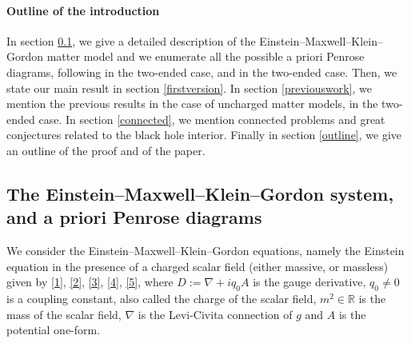 \documentclass[10pt,a4paper]{article}
\theoremstyle{plain}
\theoremstyle{remark}
\theoremstyle{definition}
\newcommand{\RR}{\mathbb{R}}
\theoremstyle{plain}
\theoremstyle{remark}
\theoremstyle{definition}
\numberwithin{equation}{section}
\begin{document}
 	\paragraph{Outline of the introduction} In section \ref{apriori}, we give a detailed description of the Einstein--Maxwell--Klein--Gordon matter model and we enumerate all the possible a priori Penrose diagrams, following \cite{Kommemi} in the two-ended case, and \cite{MihalisSStrapped} in the two-ended case. Then, we state our main result in section \ref{firstversion}. In section \ref{previouswork}, we mention the previous results in the case of uncharged matter models, in the two-ended case. In section \ref{connected}, we mention connected problems and great conjectures related to the black hole interior. Finally in section \ref{outline}, we give an outline of the proof and of the paper.
 	
 	
 	\subsection{The Einstein--Maxwell--Klein--Gordon system, and a priori Penrose diagrams} \label{apriori}
 	
 	
 	
 	
 	We consider the Einstein--Maxwell--Klein--Gordon equations, namely the Einstein equation in the presence of a charged scalar field (either massive, or massless) given by \eqref{1}, \eqref{2}, \eqref{3}, \eqref{4}, \eqref{5}, where $D:= \nabla+  iq_{0}A$ is the gauge derivative, $q_0 \neq 0$ is a coupling constant, also called the charge of the scalar field, $m^2 \in \RR$ is the mass of the scalar field, $\nabla$ is the Levi-Civita connection of $g$ and $A$ is the potential one-form.
 	
\end{document}
